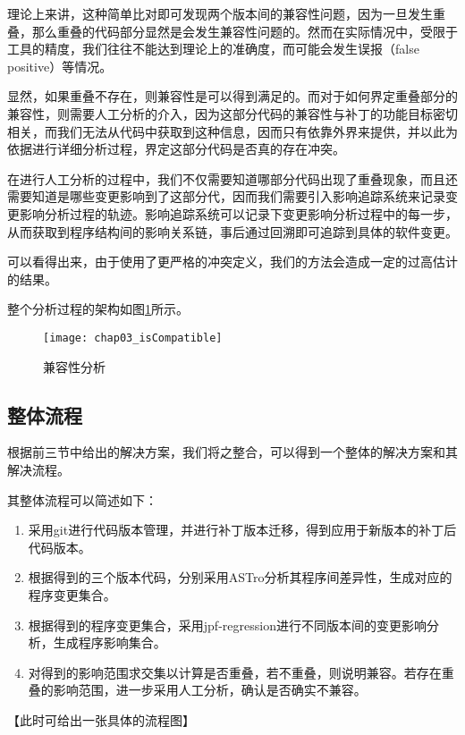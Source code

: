 理论上来讲，这种简单比对即可发现两个版本间的兼容性问题，因为一旦发生重叠，那么重叠的代码部分显然是会发生兼容性问题的。然而在实际情况中，受限于工具的精度，我们往往不能达到理论上的准确度，而可能会发生误报（false positive）等情况。

显然，如果重叠不存在，则兼容性是可以得到满足的。而对于如何界定重叠部分的兼容性，则需要人工分析的介入，因为这部分代码的兼容性与补丁的功能目标密切相关，而我们无法从代码中获取到这种信息，因而只有依靠外界来提供，并以此为依据进行详细分析过程，界定这部分代码是否真的存在冲突。

在进行人工分析的过程中，我们不仅需要知道哪部分代码出现了重叠现象，而且还需要知道是哪些变更影响到了这部分代，因而我们需要引入影响追踪系统来记录变更影响分析过程的轨迹。影响追踪系统可以记录下变更影响分析过程中的每一步，从而获取到程序结构间的影响关系链，事后通过回溯即可追踪到具体的软件变更。

可以看得出来，由于使用了更严格的冲突定义，我们的方法会造成一定的过高估计的结果。

整个分析过程的架构如图\ref {isCompatible}所示。

\begin{figure}[H]
	\centering
	\texttt{[image: chap03\_isCompatible]}
	\caption {兼容性分析}
	\label {isCompatible}	
\end{figure}

\subsection{整体流程}

根据前三节中给出的解决方案，我们将之整合，可以得到一个整体的解决方案和其解决流程。

其整体流程可以简述如下：

	\begin{enumerate}
		\item 采用git进行代码版本管理，并进行补丁版本迁移，得到应用于新版本的补丁后代码版本。
		\item 根据得到的三个版本代码，分别采用ASTro分析其程序间差异性，生成对应的程序变更集合。
		\item 根据得到的程序变更集合，采用jpf-regression进行不同版本间的变更影响分析，生成程序影响集合。
		\item 对得到的影响范围求交集以计算是否重叠，若不重叠，则说明兼容。若存在重叠的影响范围，进一步采用人工分析，确认是否确实不兼容。
	\end{enumerate}
	
	【此时可给出一张具体的流程图】
